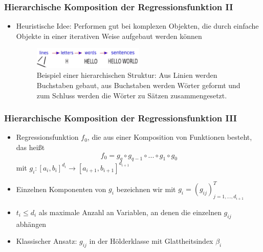 \documentclass[hyperref={pdfpagelabels=false}]{beamer}
\begin{document}
\begin{frame}
\frametitle{Hierarchische Komposition der Regressionsfunktion \RN{2}}
\begin{itemize}
\item Heuristische Idee: Performen gut bei komplexen Objekten, die durch einfache Objekte in einer iterativen Weise aufgebaut werden können \bigskip
\begin{figure}[h]
  \centering
  \includegraphics[width=0.5\textwidth]{Bilder/composition.png}
  \caption[Caption for LOF]{Beispiel einer hierarchischen Struktur: Aus Linien werden Buchstaben gebaut, aus Buchstaben werden Wörter geformt und zum Schluss werden die Wörter zu Sätzen zusammengesetzt.}
\end{figure}
\end{itemize}
\end{frame}

\begin{frame}
\frametitle{Hierarchische Komposition der Regressionsfunktion \RN{3}}
\begin{itemize}
\item Regressionsfunktion $f_0$, die aus einer Komposition von Funktionen besteht, das heißt 
\begin{equation*} 
f_0 = g_q \circ g_{q-1} \circ ... \circ g_1 \circ g_0
\end{equation*}
mit $g_i:[a_i, b_i]^{d_i} \rightarrow [a_{i+1}, b_{i+1}]^{d_{i+1}}$ 
\item Einzelnen Komponenten von $g_i$ bezeichnen wir mit $g_i = (g_{ij})_{j=1,...,d_{i+1}}^T$
\item $t_i \leq d_i$ als maximale Anzahl an Variablen, an denen die einzelnen $g_{ij}$ abhängen
\item Klassischer Ansatz: $g_{ij}$ in der Hölderklasse mit Glattheitsindex $\beta _i$
\end{itemize}
\end{frame}
\end{document}
